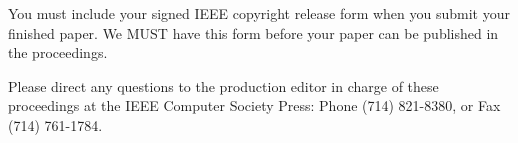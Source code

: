 \documentclass[times, 10pt,twocolumn]{article}
\begin{document}

You must include your signed IEEE copyright release form when you submit 
your finished paper. We MUST have this form before your paper can be 
published in the proceedings.


Please direct any questions to the production editor in charge of these 
proceedings at the IEEE Computer Society Press: Phone (714) 821-8380, or 
Fax (714) 761-1784.

\nocite{ex1,ex2}


\end{document}
